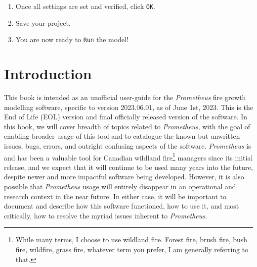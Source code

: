 \documentclass[
  letterpaper,
  DIV=11,
  numbers=noendperiod]{scrreprt}
\providecommand{\tightlist}{%
  \setlength{\itemsep}{0pt}\setlength{\parskip}{0pt}}
\begin{document}
\begin{enumerate}
\begin{enumerate}
    \begin{enumerate}
    \def\labelenumiii{\roman{enumiii}.}
    \tightlist
    \item
      \texttt{Display\ interval} will default to \texttt{01:00:00} but
      this can be adjusted at the user discretion. an interval of
      \texttt{01:00:00} will display fire growth every hour. Can be
      lowered or increased depending on desire.
    \item
      \texttt{Maximum\ time\ step\ during\ acceleration:} defaults to
      \texttt{00:02:00} which is a two-minute interval time step. This
      is rarely needed to be adjusted.
    \item
      \texttt{Stop\ fire\ spread\ at\ data\ boundary} will stop your
      fire from ``spreading'' beyond the extent of the fuel data.
    \item
      \texttt{Purge\ non-displayable\ time\ steps} ???
    \item
      \texttt{Fire\ may\ grow\ with\ independent\ time\ steps} useful
      for when you have multiple ignitions in one scenario.
    \end{enumerate}
  \item
    Once all settings are set and verified, click \texttt{OK}.
  \item
    Save your project.
  \item
    You are now ready to \texttt{Run} the model!
  \end{enumerate}
\end{enumerate}


\chapter{Introduction}\label{introduction}

This book is intended as an unofficial user-guide for the
\emph{Prometheus} fire growth modelling software, specific to version
2023.06.01, as of June 1st, 2023. This is the End of Life (EOL) version
and final officially released version of the software. In this book, we
will cover breadth of topics related to \emph{Prometheus}, with the goal
of enabling broader usage of this tool and to catalogue the known but
unwritten issues, bugs, errors, and outright confusing aspects of the
software. \emph{Prometheus} is and has been a valuable tool for Canadian
wildland fire\footnote{While many terms, I choose to use wildland fire.
  Forest fire, brush fire, bush fire, wildfire, grass fire, whatever
  term you prefer, I am generally referring to that.} managers since its
initial release, and we expect that it will continue to be used many
years into the future, despite newer and more impactful software being
developed. However, it is also possible that \emph{Prometheus} usage
will entirely disappear in an operational and research context in the
near future. In either case, it will be important to document and
describe how this software functioned, how to use it, and most
critically, how to resolve the myriad issues inherent to
\emph{Prometheus}.
\end{document}
